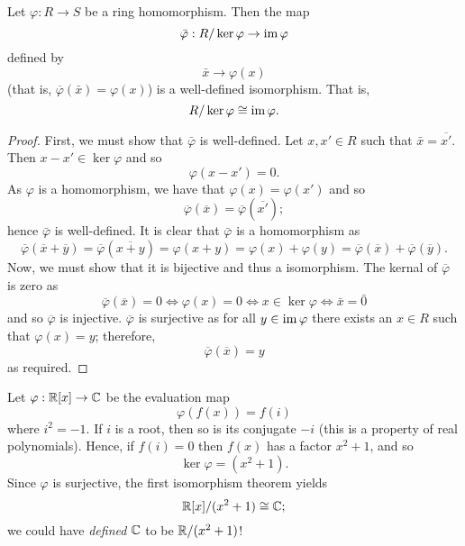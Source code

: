 
\begin{theorem}
    Let $\varphi: R \to S$ be a ring homomorphism.
    Then the map
    \[ \bar \varphi: R/\ker\varphi \to \operatorname{im}\varphi \]
    defined by
    \[ \bar x \to \varphi(x) \]
    (that is, $\overline\varphi(\bar x) = \varphi(x)$)
    is a well-defined isomorphism.
    That is,
    \[ R / \ker\varphi \cong \operatorname{im}\varphi. \]
\end{theorem}

\begin{proof}
    First, we must show that $\bar \varphi$ is well-defined.
    Let $x, x' \in R$ such that $\bar x = \overline{x'}$.
    Then $x - x' \in \ker \varphi$ and so
    \[ \varphi(x - x') = 0. \]
    As $\varphi$ is a homomorphism, we have that
    $\varphi(x) = \varphi(x')$
    and so
    \[ \overline \varphi(\overline x) = \overline \varphi(\overline{x'}); \]
    hence $\bar\varphi$ is well-defined.
    It is clear that $\bar\varphi$ is a homomorphism as
    \[ \overline \varphi(\overline x + \overline y) =
        \overline \varphi(\overline{x + y}) =
        \varphi(x + y) =
        \varphi(x) + \varphi(y) =
        \overline\varphi(\overline x) + \overline\varphi(\overline y).
    \]
    Now, we must show that it is bijective and thus a isomorphism.
    The kernal of $\overline\varphi$ is zero as
    \[ \overline\varphi(\overline x) = 0 \iff
        \varphi(x) = 0 \iff
        x \in \ker\varphi \iff
        \bar x = \bar 0 \]
    and so $\overline\varphi$ is injective.
    $\overline\varphi$ is surjective as for all 
    $y \in \operatorname{im}\varphi$ 
    there exists an $x \in R$ such that
    $\varphi(x) = y$;
    therefore,
    \[ \overline\varphi(\overline x) = y \]
    as required.
\end{proof}

\begin{example}
    Let $\varphi: \mathbb{R}[x] \to \mathbb{C}$ be the evaluation map
    \[ \varphi(f(x)) = f(i) \]
    where $i^2 = -1$.
    If $i$ is a root, then so is its conjugate $-i$
    (this is a property of real polynomials).
    Hence, if $f(i) = 0$ then $f(x)$ has a factor $x^2 + 1$, and so
    \[ \ker\varphi = (x^2 + 1). \]
    Since $\varphi$ is surjective, the first isomorphism theorem yields
    \[ \mathbb{R}[x]/(x^2 + 1) \cong \mathbb{C}; \]
    we could have \emph{defined} $\mathbb{C}$ to be $\mathbb{R}/(x^2 + 1)$!
\end{example}
